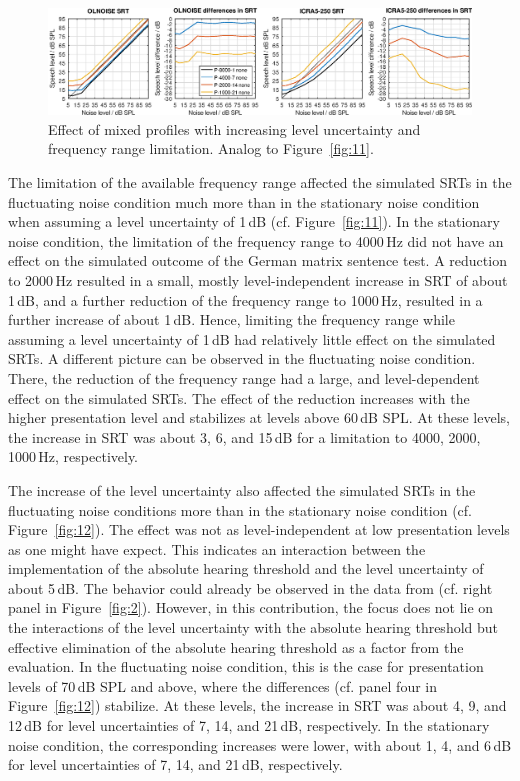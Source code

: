 \documentclass[10pt,a4paper,twocolumn]{article}
\begin{document}
%
\begin{figure}[h!]
	\centerline{\includegraphics[width=\textwidth]{images/SRTs-mixedprofiles}}
	\caption{Effect of mixed profiles with increasing level uncertainty and frequency range limitation. Analog to Figure~\ref{fig:11}.}
	\label{fig:14}
\end{figure}

The limitation of the available frequency range affected the simulated SRTs in the fluctuating noise condition much more than in the stationary noise condition when assuming a level uncertainty of 1\,dB (cf. Figure~\ref{fig:11}).
%
In the stationary noise condition, the limitation of the frequency range to 4000\,Hz did not have an effect on the simulated outcome of the German matrix sentence test.
%
A reduction to 2000\,Hz resulted in a small, mostly level-independent increase in SRT of about 1\,dB, and a further reduction of the frequency range to 1000\,Hz, resulted in a further increase of about 1\,dB.
%
Hence, limiting the frequency range while assuming a level uncertainty of 1\,dB had relatively little effect on the simulated SRTs.
%
A different picture can be observed in the fluctuating noise condition.
%
There, the reduction of the frequency range had a large, and level-dependent effect on the simulated SRTs.
%
The effect of the reduction increases with the higher presentation level and stabilizes at levels above 60\,dB SPL.
%
At these levels, the increase in SRT was about 3, 6, and 15\,dB for a limitation to 4000, 2000, 1000\,Hz, respectively.

The increase of the level uncertainty also affected the simulated SRTs in the fluctuating noise conditions more than in the stationary noise condition (cf. Figure~\ref{fig:12}).
%
The effect was not as level-independent at low presentation levels as one might have expect.
%
This indicates an interaction between the implementation of the absolute hearing threshold and the level uncertainty of about 5\,dB.
%
The behavior could already be observed in the data from \cite{kollmeier2016} (cf. right panel in Figure~\ref{fig:2}).
%
However, in this contribution, the focus does not lie on the interactions of the level uncertainty with the absolute hearing threshold but effective elimination of the absolute hearing threshold as a factor from the evaluation.
%
In the fluctuating noise condition, this is the case for presentation levels of 70\,dB SPL and above, where the differences (cf. panel four in Figure~\ref{fig:12}) stabilize.
%
At these levels, the increase in SRT was about 4, 9, and 12\,dB for level uncertainties of 7, 14, and 21\,dB, respectively.
%
In the stationary noise condition, the corresponding increases were lower, with about 1, 4, and 6\,dB for level uncertainties of 7, 14, and 21\,dB, respectively.
\end{document}
